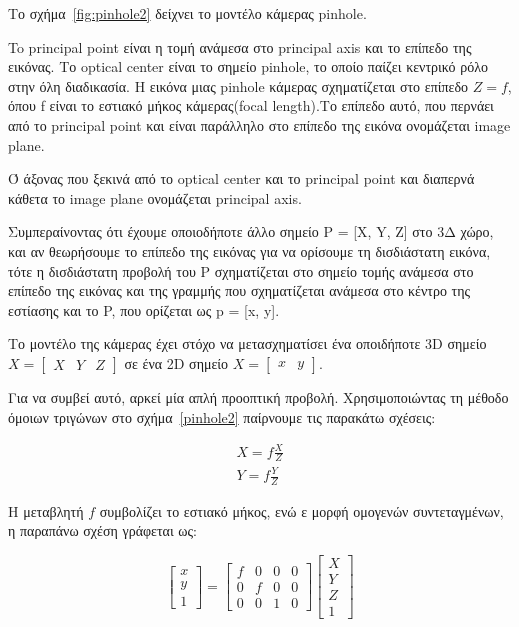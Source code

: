 
Το σχήμα~\ref{fig:pinhole2} δείχνει το μοντέλο κάμερας pinhole. 

To principal point είναι η τομή ανάμεσα στο principal axis και το επίπεδο της εικόνας. Το optical center είναι το σημείο pinhole, το οποίο παίζει κεντρικό ρόλο στην όλη διαδικασία. Η εικόνα μιας pinhole κάμερας σχηματίζεται στο επίπεδο $Z=f$, όπου f είναι το εστιακό μήκος κάμερας(focal length).Το επίπεδο αυτό, που περνάει από το principal point και είναι παράλληλο στο επίπεδο της εικόνα ονομάζεται image plane.

Ό άξονας που ξεκινά από το optical center και το principal point και διαπερνά κάθετα το image plane ονομάζεται principal axis.








Συμπεραίνοντας ότι έχουμε οποιοδήποτε άλλο σημείο P = [X, Y, Z] στο 3Δ χώρο, και αν θεωρήσουμε το επίπεδο της εικόνας για να ορίσουμε τη δισδιάστατη εικόνα, τότε η δισδιάστατη προβολή του P σχηματίζεται στο σημείο τομής ανάμεσα στο επίπεδο της εικόνας και της γραμμής που σχηματίζεται ανάμεσα στο κέντρο της εστίασης και το P, που ορίζεται ως p = [x, y]. 



Το μοντέλο της κάμερας έχει στόχο να μετασχηματίσει ένα οποιδήποτε 3D σημείο $X = \begin{bmatrix} X & Y & Z \end{bmatrix}$ σε ένα 2D σημείο $X = \begin{bmatrix} x & y\end{bmatrix}$. 




Για να συμβεί αυτό, αρκεί μία απλή προοπτική προβολή. Χρησιμοποιώντας τη μέθοδο όμοιων τριγώνων στο σχήμα~\ref{pinhole2} παίρνουμε τις παρακάτω σχέσεις:


\begin{equation}
\begin{aligned}
X=f\frac{X}{Z}\\
Y=f\frac{Y}{Z}
\end{aligned}
\end{equation}


Η μεταβλητή $f$ συμβολίζει το εστιακό μήκος, ενώ ε μορφή ομογενών συντεταγμένων, η παραπάνω σχέση γράφεται ως:

\begin{equation}
\begin{bmatrix}
x\\y\\1
\end{bmatrix}
=
\begin{bmatrix}
f & 0 & 0 & 0\\
0 & f & 0 & 0\\
0 & 0 & 1 & 0
\end{bmatrix}
\begin{bmatrix}
X\\
Y\\
Z\\
1
\end{bmatrix}
\end{equation}



